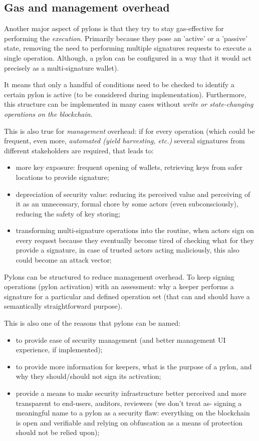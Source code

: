 \documentclass[12pt]{article}
\begin{document}
\subsection{Gas and management overhead}

Another major aspect of pylons is that they try to stay gas-effective for performing the \emph{execution}. Primarily because they pose an 'active' or a 'passive' state, removing the need to performing multiple signatures requests to execute a single operation. Although, a pylon can be configured in a way that it would act precisely as a multi-signature wallet).

It means that only a handful of conditions need to be checked to identify a certain pylon is active (to be considered during implementation). Furthermore, this structure can be implemented in many cases without \emph{write or state-changing operations on the blockchain}.

\bigskip

This is also true for \emph{management} overhead: if for every operation (which could be frequent, even more, \emph{automated (yield harvesting, etc.)} several signatures from different stakeholders are required, that leads to:
\begin{itemize}
\item{more key exposure: frequent opening of wallets, retrieving keys from safer locations to provide signature;}
\item{depreciation of security value: reducing its perceived value and perceiving of it as an unnecessary, formal chore by some actors (even subconsciously), reducing the safety of key storing;}
\item{transforming multi-signature operations into the routine, when actors sign on every request because they eventually become tired of checking what for they provide a signature, in case of trusted actors acting maliciously, this also could become an attack vector;}
\end{itemize}

Pylons can be structured to reduce management overhead. To keep signing operations (pylon activation) with an assessment: why a keeper performs a signature for a particular and defined operation set (that can and should have a semantically straightforward purpose).

\bigskip

This is also one of the reasons that pylons can be named:
\begin{itemize}
\item{to provide ease of security management (and better management UI experience, if implemented);}
\item{to provide more information for keepers, what is the purpose of a pylon, and why they should/should not sign its activation;}
\item{provide a means to make security infrastructure better perceived and more transparent to end-users, auditors, reviewers (we don’t treat as- signing a meaningful name to a pylon as a security flaw: everything on the blockchain is open and verifiable and relying on obfuscation as a means of protection should not be relied upon);}
\end{itemize}
\end{document}

